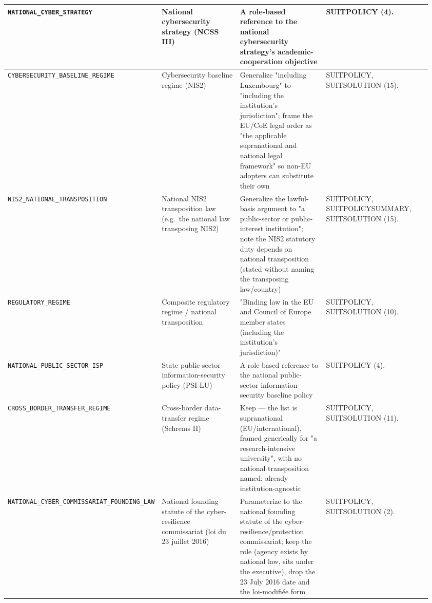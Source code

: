 \begin{center}
\begin{longtable}{@{}p{0.20\linewidth}p{0.24\linewidth}p{0.24\linewidth}p{0.28\linewidth}@{}}
\texttt{NATIONAL\_CYBER\_STRATEGY} &
National cybersecurity strategy (NCSS III) &
A role-based reference to the national cybersecurity strategy's academic-cooperation objective &
SUITPOLICY (4).\\
\midrule

\texttt{CYBERSECURITY\_BASELINE\_REGIME} &
Cybersecurity baseline regime (NIS2) &
Generalize "including Luxembourg" to "including the institution's jurisdiction"; frame the EU/CoE legal order as "the applicable supranational and national legal framework" so non-EU adopters can substitute their own &
SUITPOLICY, SUITSOLUTION (15).\\
\midrule

\texttt{NIS2\_NATIONAL\_TRANSPOSITION} &
National NIS2 transposition law (e.g.\ the national law transposing NIS2) &
Generalize the lawful-basis argument to "a public-sector or public-interest institution"; note the NIS2 statutory duty depends on national transposition (stated without naming the transposing law/country) &
SUITPOLICY, SUITPOLICYSUMMARY, SUITSOLUTION (15).\\
\midrule

\texttt{REGULATORY\_REGIME} &
Composite regulatory regime / national transposition &
"Binding law in the EU and Council of Europe member states (including the institution's jurisdiction)" &
SUITPOLICY, SUITSOLUTION (10).\\
\midrule

\texttt{NATIONAL\_PUBLIC\_SECTOR\_ISP} &
State public-sector information-security policy (PSI-LU) &
A role-based reference to the national public-sector information-security baseline policy &
SUITPOLICY (4).\\
\midrule

\texttt{CROSS\_BORDER\_TRANSFER\_REGIME} &
Cross-border data-transfer regime (Schrems II) &
Keep --- the list is supranational (EU/international), framed generically for "a research-intensive university", with no national transposition named; already institution-agnostic &
SUITPOLICY, SUITSOLUTION (11).\\
\midrule

\texttt{NATIONAL\_CYBER\_COMMISSARIAT\_FOUNDING\_LAW} &
National founding statute of the cyber-resilience commissariat (loi du 23 juillet 2016) &
Parameterize to the national founding statute of the cyber-resilience/protection commissariat; keep the role (agency exists by national law, sits under the executive), drop the 23 July 2016 date and the loi-modifi\'ee form &
SUITPOLICY, SUITSOLUTION (2).\\
\midrule


\end{longtable}
\end{center}

